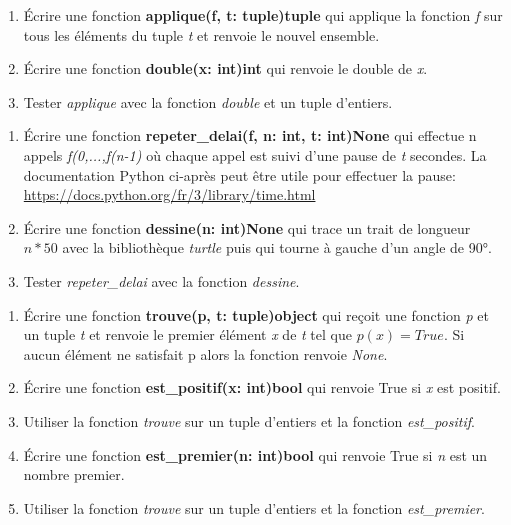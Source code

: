 \documentclass[a4paper,11pt]{article}
\begin{document}
\begin{Form}
\begin{exo}
\begin{enumerate}
\item Écrire une fonction \textbf{applique(f, t: tuple)\;\rightarrow\;tuple} qui applique la fonction \emph{f} sur tous les éléments du tuple \emph{t} et renvoie le nouvel ensemble.
\item Écrire une fonction \textbf{double(x: int)\;\rightarrow\;int} qui renvoie le double de \emph{x}.
\item Tester \emph{applique} avec la fonction \emph{double} et un tuple d'entiers.
\end{enumerate}
\end{exo}
\begin{exo}
\begin{enumerate}
\item Écrire une fonction \textbf{repeter\_delai(f, n: int, t: int)\;\rightarrow\;None} qui effectue n appels \emph{f(0,...,f(n-1)} où chaque appel est suivi d'une pause de \emph{t} secondes. La documentation Python ci-après peut être utile pour effectuer la pause: \url{https://docs.python.org/fr/3/library/time.html}
\item Écrire une fonction \textbf{dessine(n: int)\;\rightarrow\;None} qui trace un trait de longueur $n*50$ avec la bibliothèque \emph{turtle} puis qui tourne à gauche d'un angle de 90°.
\item Tester \emph{repeter\_delai} avec la fonction \emph{dessine}.
\end{enumerate}
\end{exo}
\begin{exo}
\begin{enumerate}
\item Écrire une fonction \textbf{trouve(p, t: tuple)\;\rightarrow\;object} qui reçoit une fonction \emph{p} et un tuple \emph{t} et renvoie le premier élément \emph{x} de \emph{t} tel que $p(x)=True$. Si aucun élément ne satisfait p alors la fonction renvoie \emph{None}.
\item Écrire une fonction \textbf{est\_positif(x: int)\;\rightarrow\;bool} qui renvoie True si \emph{x} est positif. \item Utiliser la fonction \emph{trouve} sur un tuple d'entiers et la fonction \emph{est\_positif}.
\item Écrire une fonction \textbf{est\_premier(n: int)\;\rightarrow\;bool} qui renvoie True si \emph{n} est un nombre premier.
\item Utiliser la fonction \emph{trouve} sur un tuple d'entiers et la fonction \emph{est\_premier}.

\end{enumerate}
\end{exo}
\end{Form}
\end{document}
